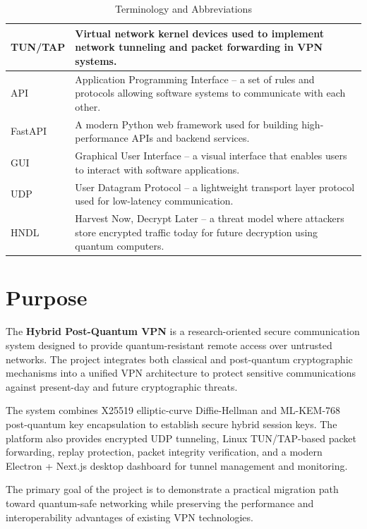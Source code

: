 \begin{table}[H]
\begin{tabular}{|l|p{10cm}|}
TUN/TAP & Virtual network kernel devices used to implement network tunneling and packet forwarding in VPN systems. \\ \hline

API & Application Programming Interface -- a set of rules and protocols allowing software systems to communicate with each other. \\ \hline

FastAPI & A modern Python web framework used for building high-performance APIs and backend services. \\ \hline

GUI & Graphical User Interface -- a visual interface that enables users to interact with software applications. \\ \hline

UDP & User Datagram Protocol -- a lightweight transport layer protocol used for low-latency communication. \\ \hline

HNDL & Harvest Now, Decrypt Later -- a threat model where attackers store encrypted traffic today for future decryption using quantum computers. \\ \hline

\end{tabular}
\caption{Terminology and Abbreviations}
\end{table}

\section{Purpose}

The \textbf{Hybrid Post-Quantum VPN} is a research-oriented secure communication system designed to provide quantum-resistant remote access over untrusted networks. The project integrates both classical and post-quantum cryptographic mechanisms into a unified VPN architecture to protect sensitive communications against present-day and future cryptographic threats.

The system combines X25519 elliptic-curve Diffie-Hellman and ML-KEM-768 post-quantum key encapsulation to establish secure hybrid session keys. The platform also provides encrypted UDP tunneling, Linux TUN/TAP-based packet forwarding, replay protection, packet integrity verification, and a modern Electron + Next.js desktop dashboard for tunnel management and monitoring.

The primary goal of the project is to demonstrate a practical migration path toward quantum-safe networking while preserving the performance and interoperability advantages of existing VPN technologies.

